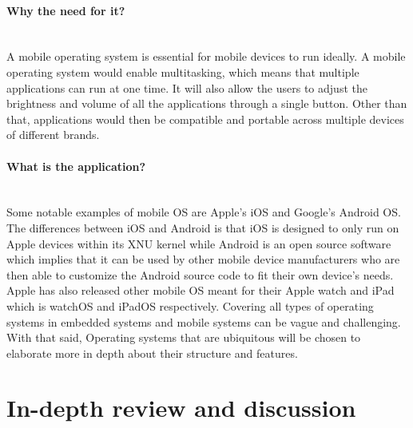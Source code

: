 \documentclass[conference]{IEEEtran}
\begin{document}
\paragraph{Why the need for it?}\mbox{} \\
A mobile operating system is essential for mobile devices to run ideally. A mobile operating system would enable multitasking, which means that multiple applications can run at one time. It will also allow the users to adjust the brightness and volume of all the applications through a single button. Other than that, applications would then be compatible and portable across multiple devices of different brands.
\\
\paragraph{What is the application?}\mbox{} \\
Some notable examples of mobile OS are Apple’s iOS and Google’s Android OS. The differences between iOS and Android is that iOS is designed to only run on Apple devices within its XNU kernel while Android is an open source software which implies that it can be used by other mobile device manufacturers who are then able to customize the Android source code to fit their own device’s needs. Apple has also released other mobile OS meant for their Apple watch and iPad which is watchOS and iPadOS respectively\cite{CSMOS}.
Covering all types of operating systems in embedded systems and mobile systems can be vague and challenging. With that said, Operating  systems  that are ubiquitous will be chosen to elaborate more in depth about their structure and features.



\section{In-depth review and discussion}


\end{document}

